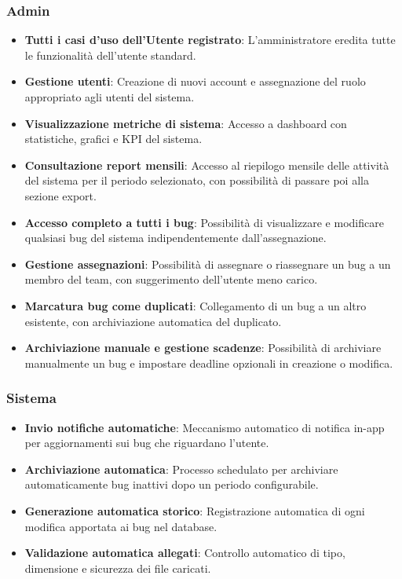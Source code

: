 ﻿\documentclass[a4paper,11pt]{article}
\begin{document}
\subsubsection{Admin}
\begin{itemize}
  \item \textbf{Tutti i casi d'uso dell'Utente registrato}: L'amministratore eredita tutte le funzionalit\`a dell'utente standard.
  \item \textbf{Gestione utenti}: Creazione di nuovi account e assegnazione del ruolo appropriato agli utenti del sistema.
  \item \textbf{Visualizzazione metriche di sistema}: Accesso a dashboard con statistiche, grafici e KPI del sistema.
  \item \textbf{Consultazione report mensili}: Accesso al riepilogo mensile delle attivit\`a del sistema per il periodo selezionato, con possibilit\`a di passare poi alla sezione export.
  \item \textbf{Accesso completo a tutti i bug}: Possibilit\`a di visualizzare e modificare qualsiasi bug del sistema indipendentemente dall'assegnazione.
  \item \textbf{Gestione assegnazioni}: Possibilit\`a di assegnare o riassegnare un bug a un membro del team, con suggerimento dell'utente meno carico.
  \item \textbf{Marcatura bug come duplicati}: Collegamento di un bug a un altro esistente, con archiviazione automatica del duplicato.
  \item \textbf{Archiviazione manuale e gestione scadenze}: Possibilit\`a di archiviare manualmente un bug e impostare deadline opzionali in creazione o modifica.
\end{itemize}

\subsubsection{Sistema}
\begin{itemize}
  \item \textbf{Invio notifiche automatiche}: Meccanismo automatico di notifica in-app per aggiornamenti sui bug che riguardano l'utente.
  \item \textbf{Archiviazione automatica}: Processo schedulato per archiviare automaticamente bug inattivi dopo un periodo configurabile.
  \item \textbf{Generazione automatica storico}: Registrazione automatica di ogni modifica apportata ai bug nel database.
  \item \textbf{Validazione automatica allegati}: Controllo automatico di tipo, dimensione e sicurezza dei file caricati.
\end{itemize}
\end{document}
